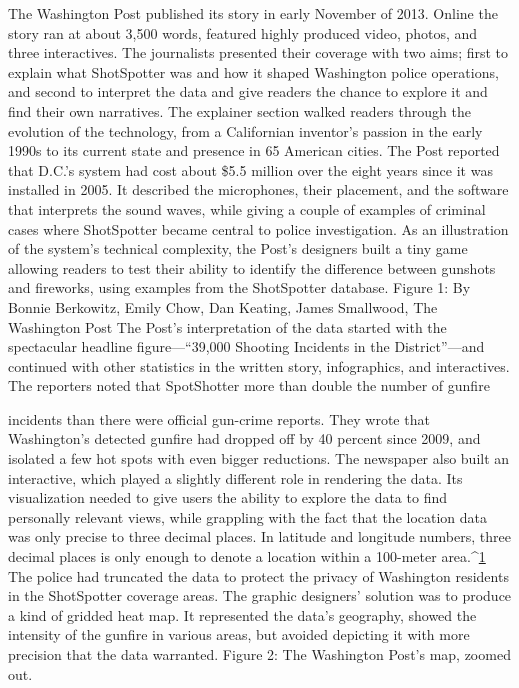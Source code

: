 The Washington Post published its story in early November of 2013. Online
the story ran at about 3,500 words, featured highly produced video, photos,
and three interactives. The journalists presented their coverage with two
aims; first to explain what ShotSpotter was and how it shaped Washington
police operations, and second to interpret the data and give readers the
chance to explore it and find their own narratives.
The explainer section walked readers through the evolution of the technology,
from a Californian inventor's passion in the early 1990s to its current
state and presence in 65 American cities. The Post reported that D.C.'s system
had cost about \$5.5 million over the eight years since it was installed in
2005. It described the microphones, their placement, and the software that
interprets the sound waves, while giving a couple of examples of criminal
cases where ShotSpotter became central to police investigation.
As an illustration of the system's technical complexity, the Post's designers
built a tiny game allowing readers to test their ability to identify the difference
between gunshots and fireworks, using examples from the ShotSpotter
database.
Figure 1: By Bonnie Berkowitz, Emily Chow, Dan Keating, James Smallwood, The Washington Post
The Post's interpretation of the data started with the spectacular headline
figure—``39,000 Shooting Incidents in the District''—and continued with
other statistics in the written story, infographics, and interactives. The
reporters noted that SpotShotter more than double the number of gunfire

incidents than there were official gun-crime reports. They wrote that Washington's
detected gunfire had dropped off by 40 percent since 2009, and
isolated a few hot spots with even bigger reductions.
The newspaper also built an interactive, which played a slightly different
role in rendering the data. Its visualization needed to give users the ability
to explore the data to find personally relevant views, while grappling with
the fact that the location data was only precise to three decimal places. In
latitude and longitude numbers, three decimal places is only enough to
denote a location within a 100-meter area.^{\href{#endnotes-wapo}{1}} The police had truncated the
data to protect the privacy of Washington residents in the ShotSpotter
coverage areas.
The graphic designers' solution was to produce a kind of gridded heat
map. It represented the data's geography, showed the intensity of the gunfire
in various areas, but avoided depicting it with more precision that the
data warranted.
Figure 2: The Washington Post's map, zoomed out.

